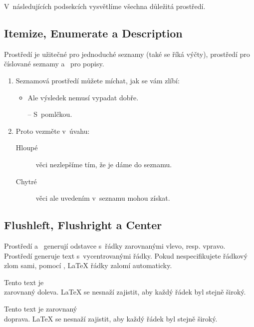 \noindent V~následujících podsekcích vysvětlíme všechna důležitá prostředí.

\subsection{Itemize, Enumerate a Description}

Prostředí  je užitečné pro jednoduché seznamy (také se říká výčty), prostředí  pro
číslované seznamy a~ pro popisy.

\begin{example}
\flushleft
\begin{enumerate}
\item Seznamová prostředí můžete
míchat, jak se vám zlíbí:
\begin{itemize}
\item Ale výsledek nemusí
vypadat dobře.
\item[--] S~pomlčkou.
\end{itemize}
\item Proto vezměte v~úvahu:
\begin{description}
\item[Hloupé] věci
nezlepšíme tím, že je
dáme do seznamu.
\item[Chytré] věci ale
uvedením v~seznamu mohou získat.
\end{description}
\end{enumerate}
\end{example}
 
\subsection{Flushleft, Flushright a Center}

Prostředí  a~ generují
odstavce s~řádky zarovnanými vlevo, resp. vpravo. Prostředí  generuje text s~vycentrovanými řádky.
Pokud nespecifikujete řádkový zlom sami, pomocí \ci{\bs}, \LaTeX{}
řádky zalomí automaticky.

\begin{example}
\begin{flushleft}
Tento text je\\ zarovnaný
doleva. \LaTeX{} se nesnaží
zajistit, aby každý řádek
byl stejně široký.
\end{flushleft}
\end{example}

\begin{example}
\begin{flushright}
Tento text je
zarovnaný\\doprava. 
\LaTeX{} se nesnaží zajistit,
aby každý řádek byl stejně
široký.
\end{flushright}
\end{example}

